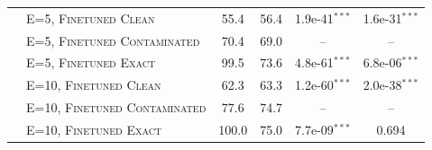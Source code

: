 \begin{table}[t]
\begin{tabular}{l l cc cc}
 & E=5, \textsc{Finetuned Clean} & 55.4 & 56.4 & 1.9e-41$^{***}$ & 1.6e-31$^{***}$ \\
 & E=5, \textsc{Finetuned Contaminated} & 70.4 & 69.0 & -- & -- \\
 & E=5, \textsc{Finetuned Exact} & 99.5 & 73.6 & 4.8e-61$^{***}$ & 6.8e-06$^{***}$ \\
 & E=10, \textsc{Finetuned Clean} & 62.3 & 63.3 & 1.2e-60$^{***}$ & 2.0e-38$^{***}$ \\
 & E=10, \textsc{Finetuned Contaminated} & 77.6 & 74.7 & -- & -- \\
 & E=10, \textsc{Finetuned Exact} & 100.0 & 75.0 & 7.7e-09$^{***}$ & 0.694 \\
\bottomrule
\end{tabular}
\end{table}